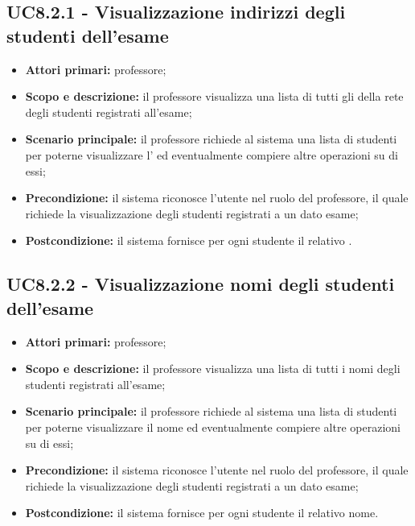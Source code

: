 \documentclass[AnalisiDeiRequisiti.tex]{subfiles}
\begin{document}
\subsection{UC8.2.1 - Visualizzazione indirizzi degli studenti dell'esame}
\begin{itemize}
	\item \textbf{Attori primari:} professore;
	\item \textbf{Scopo e descrizione:} il professore visualizza una lista di tutti gli  della rete  degli studenti registrati all'esame;
	\item \textbf{Scenario principale:} il professore richiede al sistema una lista di studenti per poterne visualizzare l' ed eventualmente compiere altre operazioni su di essi;
	\item \textbf{Precondizione:} il sistema riconosce l'utente nel ruolo del professore, il quale richiede la visualizzazione degli studenti registrati a un dato esame;
	\item \textbf{Postcondizione:} il sistema fornisce per ogni studente il relativo .
\end{itemize}
\subsection{UC8.2.2 - Visualizzazione nomi degli studenti dell'esame}
\begin{itemize}
	\item \textbf{Attori primari:} professore;
	\item \textbf{Scopo e descrizione:} il professore visualizza una lista di tutti i nomi degli studenti registrati all'esame;
	\item \textbf{Scenario principale:} il professore richiede al sistema una lista di studenti per poterne visualizzare il nome ed eventualmente compiere altre operazioni su di essi;
	\item \textbf{Precondizione:} il sistema riconosce l'utente nel ruolo del professore, il quale richiede la visualizzazione degli studenti registrati a un dato esame;
	\item \textbf{Postcondizione:} il sistema fornisce per ogni studente il relativo nome.
\end{itemize}
\end{document}

